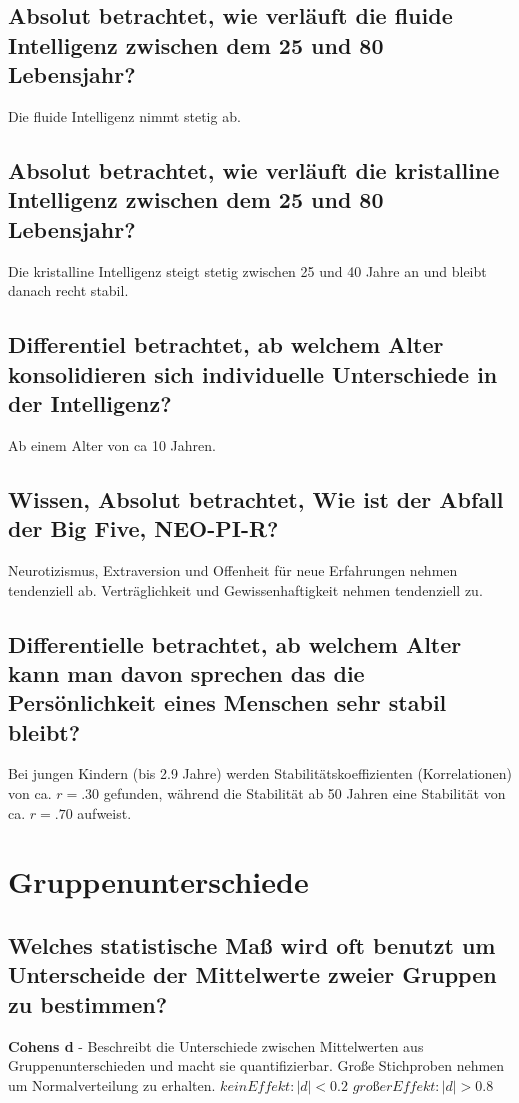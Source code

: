 \documentclass[a6paper,9pt,DIV=14]{scrartcl}
\begin{document}
\subsection{Absolut betrachtet, wie verläuft die fluide Intelligenz zwischen dem 25 und 80 Lebensjahr?} %
Die fluide Intelligenz nimmt stetig ab.
\subsection{Absolut betrachtet, wie verläuft die kristalline Intelligenz zwischen dem 25 und 80 Lebensjahr?}
Die kristalline Intelligenz steigt stetig zwischen 25 und 40 Jahre an und bleibt danach recht stabil.
\subsection{Differentiel betrachtet, ab welchem Alter konsolidieren sich individuelle Unterschiede in der Intelligenz?} %
Ab einem Alter von ca 10 Jahren.
\subsection{Wissen, Absolut betrachtet, Wie ist der Abfall der Big Five, NEO-PI-R?} %
Neurotizismus, Extraversion und Offenheit für neue Erfahrungen nehmen tendenziell ab. Verträglichkeit und Gewissenhaftigkeit nehmen tendenziell zu.
\subsection{Differentielle betrachtet, ab welchem Alter kann man davon sprechen das die Persönlichkeit eines Menschen sehr stabil bleibt?} %
Bei jungen Kindern (bis 2.9 Jahre) werden Stabilitätskoeffizienten (Korrelationen) von ca. $r = .30$ gefunden, während die Stabilität ab 50 Jahren eine Stabilität von ca. $r = .70$ aufweist.

\section{Gruppenunterschiede}

\subsection{Welches statistische Maß wird oft benutzt um Unterscheide der Mittelwerte zweier Gruppen zu bestimmen?} %
\textbf{Cohens d} - Beschreibt die Unterschiede zwischen Mittelwerten aus Gruppenunterschieden und macht sie quantifizierbar. Große Stichproben nehmen um Normalverteilung zu erhalten. $kein Effekt: |d| < 0.2$ $großer Effekt: |d| > 0.8$
\end{document}
